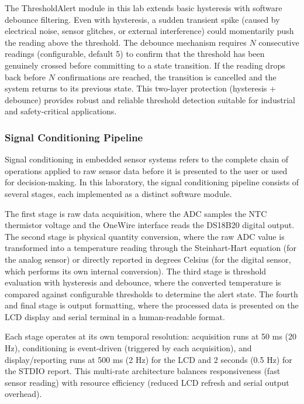 The ThresholdAlert module in this lab extends basic hysteresis with software debounce filtering. Even with hysteresis, a sudden transient spike (caused by electrical noise, sensor glitches, or external interference) could momentarily push the reading above the threshold. The debounce mechanism requires $N$ consecutive readings (configurable, default 5) to confirm that the threshold has been genuinely crossed before committing to a state transition. If the reading drops back before $N$ confirmations are reached, the transition is cancelled and the system returns to its previous state. This two-layer protection (hysteresis + debounce) provides robust and reliable threshold detection suitable for industrial and safety-critical applications.

\subsubsection{Signal Conditioning Pipeline}

Signal conditioning in embedded sensor systems refers to the complete chain of operations applied to raw sensor data before it is presented to the user or used for decision-making. In this laboratory, the signal conditioning pipeline consists of several stages, each implemented as a distinct software module.

The first stage is raw data acquisition, where the ADC samples the NTC thermistor voltage and the OneWire interface reads the DS18B20 digital output. The second stage is physical quantity conversion, where the raw ADC value is transformed into a temperature reading through the Steinhart-Hart equation (for the analog sensor) or directly reported in degrees Celsius (for the digital sensor, which performs its own internal conversion). The third stage is threshold evaluation with hysteresis and debounce, where the converted temperature is compared against configurable thresholds to determine the alert state. The fourth and final stage is output formatting, where the processed data is presented on the LCD display and serial terminal in a human-readable format.

Each stage operates at its own temporal resolution: acquisition runs at 50 ms (20 Hz), conditioning is event-driven (triggered by each acquisition), and display/reporting runs at 500 ms (2 Hz) for the LCD and 2 seconds (0.5 Hz) for the STDIO report. This multi-rate architecture balances responsiveness (fast sensor reading) with resource efficiency (reduced LCD refresh and serial output overhead).

